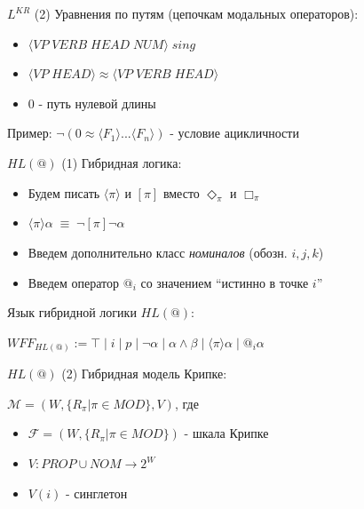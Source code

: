 \documentclass{beamer}
\begin{document}
\begin{frame}{$L^{KR}$ (2)}
Уравнения по путям (цепочкам модальных операторов):\\
\bigskip
\begin{itemize}
	\item $\langle VP \; VERB \; HEAD \; NUM \rangle \; sing$
	\item $\langle VP \; HEAD \rangle \approx \langle VP \; VERB \; HEAD \rangle$
	\item $0$ - путь нулевой длины
\end{itemize}
\bigskip
Пример: $\neg(0 \approx \langle F_1 \rangle ... \langle F_n \rangle)$ - условие ацикличности
\end{frame}

\begin{frame}{$HL(@)$ (1)}
Гибридная логика:\\
\bigskip
\begin{itemize}
	\item Будем писать $\langle \pi \rangle$ и $[\pi]$ вместо $\Diamond_\pi$ и $\Box_\pi$
	\item $\langle \pi \rangle \alpha \; \equiv \; \neg [\pi] \neg \alpha$
	\item Введем дополнительно класс \textit{номиналов} (обозн. $i, j, k$)
	\item Введем оператор $@_i$ со значением ``истинно в точке $i$''
\end{itemize}
\bigskip
Язык гибридной логики $HL(@)$:\\
\begin{center}
$WFF_{HL(@)} := \top \; \vert \; i \; \vert \; p \; \vert \; \neg \alpha \; | \; \alpha \wedge \beta \; \vert \; \langle \pi \rangle \alpha \; \vert \; @_i \alpha$
\end{center}
\end{frame}

\begin{frame}{$HL(@)$ (2)}
Гибридная модель Крипке:\\
\bigskip
\begin{center}
$\mathcal{M} = (W, \{R_\pi \vert \pi \in MOD\}, V)$, где\\
\bigskip
\begin{itemize}
	\item $\mathcal{F} = (W, \{R_\pi \vert \pi \in MOD\})$ - шкала Крипке
	\item $V : PROP \cup NOM \to 2^W$
	\item $V(i)$ - синглетон
\end{itemize}
\end{center}
\end{frame}
\end{document}
